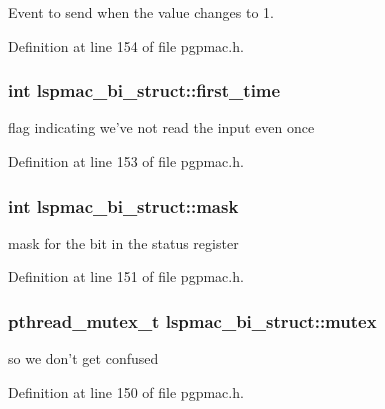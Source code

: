 Event to send when the value changes to 1. 



Definition at line 154 of file pgpmac.\-h.

\hypertarget{structlspmac__bi__struct_a814978c33dc99e7911faa4ddb12bfd90}{
\subsubsection[{first\-\_\-time}]{\setlength{\rightskip}{0pt plus 5cm}int lspmac\-\_\-bi\-\_\-struct\-::first\-\_\-time}}\label{structlspmac__bi__struct_a814978c33dc99e7911faa4ddb12bfd90}


flag indicating we've not read the input even once 



Definition at line 153 of file pgpmac.\-h.

\hypertarget{structlspmac__bi__struct_ac010058c9883088705059dee1d90ee72}{
\subsubsection[{mask}]{\setlength{\rightskip}{0pt plus 5cm}int lspmac\-\_\-bi\-\_\-struct\-::mask}}\label{structlspmac__bi__struct_ac010058c9883088705059dee1d90ee72}


mask for the bit in the status register 



Definition at line 151 of file pgpmac.\-h.

\hypertarget{structlspmac__bi__struct_a58053a98fa4696b56d674e775b3b4690}{
\subsubsection[{mutex}]{\setlength{\rightskip}{0pt plus 5cm}pthread\-\_\-mutex\-\_\-t lspmac\-\_\-bi\-\_\-struct\-::mutex}}\label{structlspmac__bi__struct_a58053a98fa4696b56d674e775b3b4690}


so we don't get confused 



Definition at line 150 of file pgpmac.\-h.

